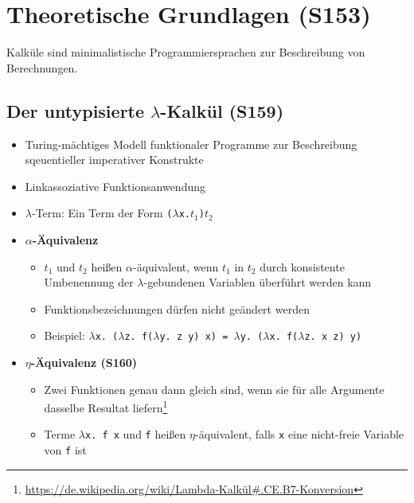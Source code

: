 \section{Theoretische Grundlagen (S153)}
Kalküle sind minimalistische Programmiersprachen zur Beschreibung von Berechnungen.	

\subsection{Der untypisierte $\lambda$-Kalkül (S159)}
\begin{itemize}
	\item Turing-mächtiges Modell funktionaler Programme zur Beschreibung sqeuentieller imperativer Konstrukte
	\item Linkassoziative Funktionsanwendung
	\item \(\lambda\)-Term: Ein Term der Form \texttt{(\(\lambda\)x.\(t_1\))\(t_2\)}
	\item \textbf{\(\alpha\)-Äquivalenz}
	\begin{itemize}
		\item \(t_1\) und \(t_2\) heißen \(\alpha\)-äquivalent, wenn \(t_1\) in \(t_2\) durch konsistente Umbenennung der \(\lambda\)-gebundenen Variablen überführt werden kann
		\item Funktionsbezeichnungen dürfen nicht geändert werden
		\item Beispiel: \texttt{\(\lambda\)x. (\(\lambda\)z. f(\(\lambda\)y. z y) x) = \(\lambda\)y. (\(\lambda\)x. f(\(\lambda\)z. x z) y)}
	\end{itemize}
	\item \textbf{\(\eta\)-Äquivalenz (S160)}
	\begin{itemize}
		\item Zwei Funktionen genau dann gleich sind, wenn sie für alle Argumente dasselbe Resultat liefern\footnote{\url{https://de.wikipedia.org/wiki/Lambda-Kalkül\#.CE.B7-Konversion}}
		\item Terme \texttt{\(\lambda\)x. f x} und \texttt{f} heißen \(\eta\)-äquivalent, falls \texttt{x} eine nicht-freie Variable von \texttt{f} ist
	\end{itemize}
\end{itemize}

